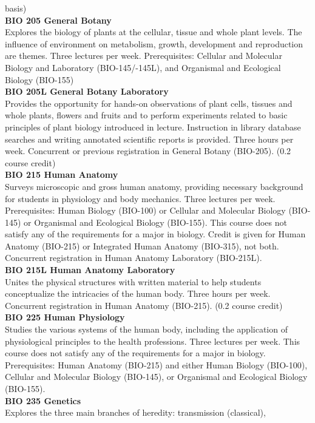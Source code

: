 \documentclass[
  letterpaper,
]{scrbook}
\begin{document}
basis)\\
\textbf{BIO 205 General Botany}\\
Explores the biology of plants at the cellular, tissue and whole plant
levels. The influence of environment on metabolism, growth, development
and reproduction are themes. Three lectures per week. Prerequisites:
Cellular and Molecular Biology and Laboratory (BIO-145/-145L), and
Organismal and Ecological Biology (BIO-155)\\
\textbf{BIO 205L General Botany Laboratory}\\
Provides the opportunity for hands-on observations of plant cells,
tissues and whole plants, flowers and fruits and to perform experiments
related to basic principles of plant biology introduced in lecture.
Instruction in library database searches and writing annotated
scientific reports is provided. Three hours per week. Concurrent or
previous registration in General Botany (BIO-205). (0.2 course credit)\\
\textbf{BIO 215 Human Anatomy}\\
Surveys microscopic and gross human anatomy, providing necessary
background for students in physiology and body mechanics. Three lectures
per week. Prerequisites: Human Biology (BIO-100) or Cellular and
Molecular Biology (BIO-145) or Organismal and Ecological Biology
(BIO-155). This course does not satisfy any of the requirements for a
major in biology. Credit is given for Human Anatomy (BIO-215) or
Integrated Human Anatomy (BIO-315), not both. Concurrent registration in
Human Anatomy Laboratory (BIO-215L).\\
\textbf{BIO 215L Human Anatomy Laboratory}\\
Unites the physical structures with written material to help students
conceptualize the intricacies of the human body. Three hours per week.
Concurrent registration in Human Anatomy (BIO-215). (0.2 course
credit)\\
\textbf{BIO 225 Human Physiology}\\
Studies the various systems of the human body, including the application
of physiological principles to the health professions. Three lectures
per week. This course does not satisfy any of the requirements for a
major in biology. Prerequisites: Human Anatomy (BIO-215) and either
Human Biology (BIO-100), Cellular and Molecular Biology (BIO-145), or
Organismal and Ecological Biology (BIO-155).\\
\textbf{BIO 235 Genetics}\\
Explores the three main branches of heredity: transmission (classical),
\end{document}
